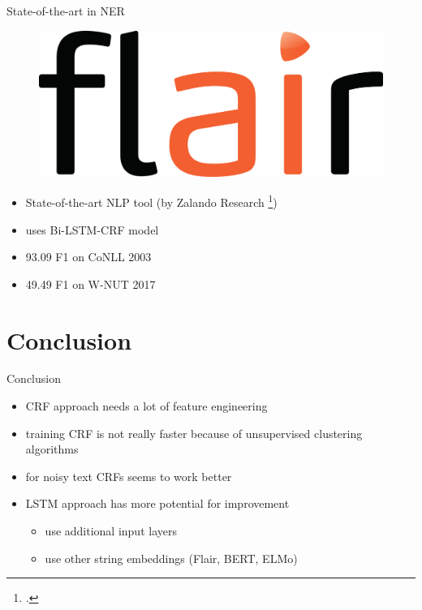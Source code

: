 \documentclass[12pt, tikz]{beamer}
\begin{document}
\begin{frame}[fragile]{State-of-the-art in NER}
	\begin{figure}
		\includegraphics[width=0.2\linewidth]{img/flair.png}
	\end{figure}
	\begin{itemize}
		\item<1-> State-of-the-art NLP tool (by Zalando Research \footcite{akbik2019flair})
		\item<2-> uses Bi-LSTM-CRF model
		\item<3-> 93.09 F1 on CoNLL 2003
		\item<4-> 49.49 F1 on W-NUT 2017
	\end{itemize}
\end{frame}


\section{Conclusion}

\begin{frame}[fragile]{Conclusion}
	\begin{itemize}
		\item<1-> CRF approach needs a lot of feature engineering
		\item<2-> training CRF is not really faster because of unsupervised clustering algorithms
		\item<3-> for noisy text CRFs seems to work better
		\item<4-> LSTM approach has more potential for improvement
		\begin{itemize}
			\item use additional input layers
			\item use other string embeddings (Flair, BERT, ELMo)
		\end{itemize}
	\end{itemize}
\end{frame}


\end{document}
